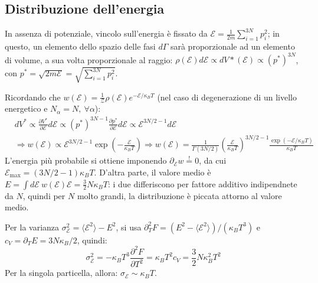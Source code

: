 \documentclass[10pt, a4paper]{scrartcl}
\numberwithin{equation}{subsection}
\theoremstyle{style1}
\theoremstyle{style2}
\begin{document}
\subsection{Distribuzione dell'energia}

In assenza di potenziale, vincolo sull'energia \`e fissato da $\mathscr{E} = \frac{1}{2m} \sum_{i=1}^{3N} p_i^2$; in questo, un elemento dello spazio delle fasi $d\Gamma$ sar\`a proporzionale ad un elemento di volume, a sua volta proporzionale al raggio: $\rho (\mathscr{E}) d \mathscr{E} \propto d V* (\mathscr{E}) \propto (p^*)^{3N } $, con $p^* = \sqrt{2 m \mathscr{E}} = \sqrt{\sum_{i=1}^{3N} p_i^2} $.

Ricordando che $w (\mathscr{E}) = \frac{1}{\mathscr{Z}}\rho (\mathscr{E}) e^{ - \mathscr{E } /\kappa _B T} $ (nel caso di degenerazione di un livello energetico e $N _\alpha  = N ,  \ \forall  \alpha $):
\[
\begin{split}
	&dV^* \propto \frac{\partial V^*}{\partial \mathscr{E}}  d \mathscr{E} \propto (p^*)^{3N -1 } \frac{\partial p^*}{\partial \mathscr{E}} d \mathscr{E}\propto \mathscr{E} ^{3N /2 -1} d \mathscr{E}\\
	&\Rightarrow  w (\mathscr{E}) \propto \mathscr{E}^{3N /2 -1 } \exp \left(- \frac{\mathscr{E}}{\kappa _B T}\right) \Rightarrow w(\mathscr{E}) = \frac{1}{\Gamma(3N / 2) } \left(\frac{\mathscr{E}}{\kappa _B T}\right) ^{3N / 2 -1} \frac{\exp(- \mathscr{E}/\kappa _B T)}{\kappa _B T}
\end{split}
\] 
L'energia pi\`u probabile si ottiene imponendo $\partial _\mathscr{E} w \stackrel{!}{=} 0$, da cui $\mathscr{E}_\text{max}= (3N / 2 -1) \kappa _B T$. D'altra parte, il valore medio \`e $E = \int d \mathscr{E} \ w(\mathscr{E}) \mathscr{E} = \frac{3}{2}N \kappa _B T $: i due differiscono per fattore additivo indipendnete da $N$, quindi per $N$ molto grandi, la distribuzione \`e piccata attorno al valore medio.

Per la varianza $\sigma _\mathscr{E}^2 = \langle \mathscr{E}^2 \rangle- E^2$, si usa $\partial _T^2 F = (E^2 - \langle \mathscr{E}^2 \rangle) / (\kappa _B T^3)$ e $c_V = \partial_T E = 3N\kappa _B / 2$, quindi:
\begin{equation}
	\sigma _\mathscr{E}^2 = - \kappa _B T^3 \frac{\partial ^2F}{\partial T^2} = \kappa _B T^2 c_V = \frac{3}{2} N\kappa _B^ 2 T^2 
\end{equation}
 Per la singola particella, allora: $\sigma _\mathscr{E} \sim \kappa _B T$.
\end{document}
